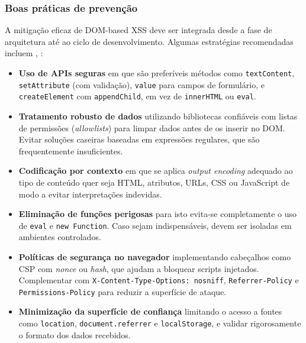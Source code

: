 \subsubsection{Boas práticas de prevenção}
\label{subsubsec:boas-praticas-prevencao-dom-xss}

A mitigação eficaz de DOM-based XSS deve ser integrada desde a fase de arquitetura até ao ciclo de desenvolvimento. Algumas estratégias recomendadas incluem \cite{ref31}, \cite{ref32}:

\begin{itemize}
    \item \textbf{Uso de APIs seguras} em que são preferíveis métodos como \texttt{textContent}, \texttt{setAttribute} (com validação), \texttt{value} para campos de formulário, e \texttt{createElement} com \texttt{appendChild}, em vez de \texttt{innerHTML} ou \texttt{eval}.
    
    \item \textbf{Tratamento robusto de dados} utilizando bibliotecas confiáveis com listas de permissões (\textit{allowlists}) para limpar dados antes de os inserir no DOM. Evitar soluções caseiras baseadas em expressões regulares, que são frequentemente insuficientes.
    
    \item \textbf{Codificação por contexto} em que se aplica \textit{output encoding} adequado ao tipo de conteúdo quer seja HTML, atributos, URLs, CSS ou JavaScript de modo a evitar interpretações indevidas.
    
    \item \textbf{Eliminação de funções perigosas} para isto evita-se completamente o uso de \texttt{eval} e \texttt{new Function}. Caso sejam indispensáveis, devem ser isoladas em ambientes controlados.
    
    \item \textbf{Políticas de segurança no navegador} implementando cabeçalhos como CSP com \textit{nonce} ou \textit{hash}, que ajudam a bloquear scripts injetados. Complementar com \texttt{X-Content-Type-Options: nosniff}, \texttt{Referrer-Policy} e \texttt{Permissions-Policy} para reduzir a superfície de ataque.
    
    \item \textbf{Minimização da superfície de confiança} limitando o acesso a fontes como \texttt{location}, \texttt{document.referrer} e \texttt{localStorage}, e validar rigorosamente o formato dos dados recebidos.
\end{itemize}

